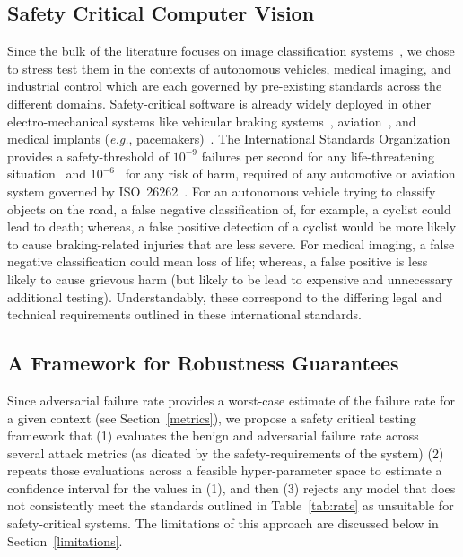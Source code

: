 \documentclass[journal]{IEEEtran}
\newcommand{\eg}{\textit{e.g.}\xspace}
\begin{document}
\subsection{Safety Critical Computer Vision}
Since the bulk of the literature focuses on image classification systems~\cite{dohmatob_generalized_2019, biggio_evasion_2013-1, bect_bayesian_2017, chakraborty_adversarial_2018, carlini_towards_2017, croce_reliable_2020}, we chose to stress test them in the contexts of autonomous vehicles, medical imaging, and industrial control which are each governed by pre-existing standards across the different domains. Safety-critical software is already widely deployed in other electro-mechanical systems like vehicular braking systems~\cite{braking}, aviation~\cite{aviation}, and medical implants (\eg, pacemakers)~\cite{tuan2010modeling}. The International Standards Organization provides a safety-threshold of $10^{-9}$ failures per second for any life-threatening situation~\cite{iso26262} and $10^{-6}$~\cite{iso26262} for any risk of harm, required of any automotive or aviation system governed by ISO~26262~\cite{iso26262}. For an autonomous vehicle trying to classify objects on the road, a false negative classification of, for example, a cyclist could lead to death; whereas, a false positive detection of a cyclist would be more likely to cause braking-related injuries that are less severe. For medical imaging, a false negative classification could mean loss of life; whereas, a false positive is less likely to cause grievous harm (but likely to be lead to expensive and unnecessary additional testing).  Understandably, these correspond to the differing legal and technical requirements outlined in these international standards.



\subsection{A Framework for Robustness Guarantees}
\label{safety_critical}
Since adversarial failure rate provides a worst-case estimate of the failure rate for a given context (see Section~\ref{metrics}), we propose a safety critical testing framework that (1) evaluates the benign and adversarial failure rate across several attack metrics (as dicated by the safety-requirements of the system) (2) repeats those evaluations across a feasible hyper-parameter space to estimate a confidence interval for the values in (1), and then (3)  rejects any model that does not consistently meet the standards outlined in Table~\ref{tab:rate} as unsuitable for safety-critical systems. The limitations of this approach are discussed below in Section~\ref{limitations}.
\end{document}

